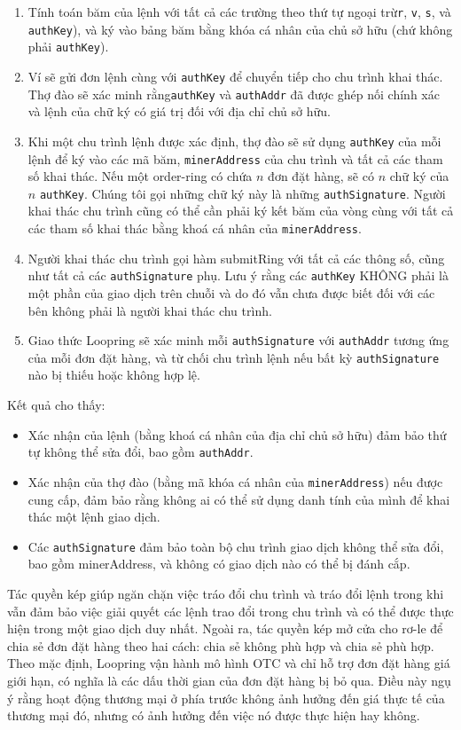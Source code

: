 \documentclass{article}
\begin{document}
\begin{multicols}{2}
\begin{enumerate}
	\item Tính toán băm của lệnh với tất cả các trường theo thứ tự ngoại trừ\verb|r|, \verb|v|, \verb|s|, và \verb|authKey|), và ký vào bảng băm bằng khóa cá nhân của chủ sở hữu (chứ không phải \verb|authKey|).
	\item Ví sẽ gửi đơn lệnh cùng với \verb|authKey| để chuyển tiếp cho chu trình khai thác. Thợ đào sẽ xác minh rằng\verb|authKey| và \verb|authAddr| đã được ghép nối chính xác và lệnh của chữ ký có giá trị đối với địa chỉ chủ sở hữu.
	\item Khi một chu trình lệnh được xác định, thợ đào sẽ sử dụng \verb|authKey| của mỗi lệnh để ký vào các mã băm, \verb|minerAddress| của chu trình và tất cả các tham số khai thác. Nếu một order-ring có chứa $n$ đơn đặt hàng, sẽ có $n$ chữ ký của $n$ \verb|authKey|. Chúng tôi gọi những chữ ký này là những \verb|authSignature|. Người khai thác chu trình cũng có thể cần phải ký kết băm của vòng cùng với tất cả các tham số khai thác bằng khoá cá nhân của \verb|minerAddress|.
	\item Người khai thác chu trình gọi hàm submitRing với tất cả các thông số, cũng như tất cả các \verb|authSignature| phụ. Lưu ý rằng các \verb|authKey| KHÔNG phải là một phần của giao dịch trên chuỗi và do đó vẫn chưa được biết đối với các bên không phải là người khai thác chu trình.
	\item Giao thức Loopring sẽ xác minh mỗi \verb|authSignature| với \verb|authAddr| tương ứng của mỗi đơn đặt hàng, và từ chối chu trình lệnh nếu bất kỳ \verb|authSignature| nào bị thiếu hoặc không hợp lệ.
 
\end{enumerate}
Kết quả cho thấy:
\begin{itemize}
	\item  Xác nhận của lệnh (bằng khoá cá nhân của địa chỉ chủ sở hữu) đảm bảo thứ tự không thể sửa đổi, bao gồm \verb|authAddr|.
	\item  Xác nhận của thợ đào (bằng mã khóa cá nhân của \verb|minerAddress|) nếu được cung cấp, đảm bảo rằng không ai có thể sử dụng danh tính của mình để khai thác một lệnh giao dịch.
	\item  Các \verb|authSignature| đảm bảo toàn bộ chu trình giao dịch không thể sửa đổi, bao gồm minerAddress, và không có giao dịch nào có thể bị đánh cắp.
\end{itemize}
Tác quyền kép giúp ngăn chặn việc tráo đổi chu trình và tráo đổi lệnh trong khi vẫn đảm bảo việc giải quyết các lệnh trao đổi trong chu trình và có thể được thực hiện trong một giao dịch duy nhất. Ngoài ra, tác quyền kép mở cửa cho rơ-le để chia sẻ đơn đặt hàng theo hai cách: chia sẻ không phù hợp và chia sẻ phù hợp. Theo mặc định, Loopring vận hành mô hình OTC và chỉ hỗ trợ đơn đặt hàng giá giới hạn, có nghĩa là các dấu thời gian của đơn đặt hàng bị bỏ qua. Điều này ngụ ý rằng hoạt động thương mại ở phía trước không ảnh hưởng đến giá thực tế của thương mại đó, nhưng có ảnh hưởng đến việc nó được thực hiện hay không.

\end{multicols}
\end{document}
